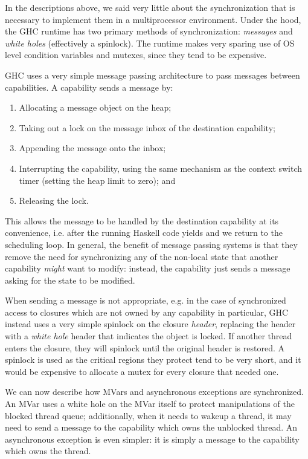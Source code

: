 In the descriptions above, we said very little about the synchronization
that is necessary to implement them in a multiprocessor environment.
Under the hood, the GHC runtime has two primary methods of synchronization:
\emph{messages} and \emph{white holes} (effectively a spinlock).  The
runtime makes very sparing use of OS level condition variables and
mutexes, since they tend to be expensive.

GHC uses a very simple message passing architecture to pass messages
between capabilities.  A capability sends a message by:

\begin{enumerate}
    \item Allocating a message object on the heap;
    \item Taking out a lock on the message inbox of the destination capability;
    \item Appending the message onto the inbox;
    \item Interrupting the capability, using the same mechanism as the context switch timer (setting the heap limit to zero); and
    \item Releasing the lock.
\end{enumerate}

This allows the message to be handled by the destination capability at
its convenience, i.e. after the running Haskell code yields and we
return to the scheduling loop.  In general, the benefit of message
passing systems is that they remove the need for synchronizing any of
the non-local state that another capability \emph{might} want to modify: instead,
the capability just sends a message asking for the state to be modified.

When sending a message is not appropriate, e.g. in the case of
synchronized access to closures which are not owned by any capability in
particular, GHC instead uses a very simple spinlock on the closure
\emph{header}, replacing the header with a \emph{white hole} header that
indicates the object is locked.  If another thread enters the closure,
they will spinlock until the original header is restored.  A spinlock is
used as the critical regions they protect tend to be very short, and it would
be expensive to allocate a mutex for every closure that needed one.

We can now describe how MVars and asynchronous exceptions are
synchronized.  An MVar uses a white hole on the MVar itself to protect
manipulations of the blocked thread queue; additionally, when it needs
to wakeup a thread, it may need to send a message to the capability
which owns the unblocked thread.  An asynchronous exception is even
simpler: it is simply a message to the capability which owns the thread.

